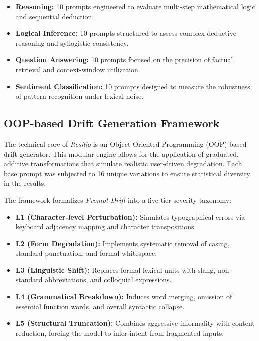 \documentclass[conference]{IEEEtran}
\begin{document}
\begin{itemize}
\item \textbf{Reasoning:} 10 prompts engineered to evaluate multi-step mathematical logic and sequential deduction.
\item \textbf{Logical Inference:} 10 prompts structured to assess complex deductive reasoning and syllogistic consistency.
\item \textbf{Question Answering:} 10 prompts focused on the precision of factual retrieval and context-window utilization.
\item \textbf{Sentiment Classification:} 10 prompts designed to measure the robustness of pattern recognition under lexical noise.
\end{itemize}

\subsection{OOP-based Drift Generation Framework}

The technical core of \textit{Resilio} is an Object-Oriented Programming (OOP) based drift generator. This modular engine allows for the application of graduated, additive transformations that simulate realistic user-driven degradation. Each base prompt was subjected to 16 unique variations to ensure statistical diversity in the results.

The framework formalizes \textit{Prompt Drift} into a five-tier severity taxonomy:

\begin{itemize}
\item \textbf{L1 (Character-level Perturbation):} Simulates typographical errors via keyboard adjacency mapping and character transpositions.
\item \textbf{L2 (Form Degradation):} Implements systematic removal of casing, standard punctuation, and formal whitespace.
\item \textbf{L3 (Linguistic Shift):} Replaces formal lexical units with slang, non-standard abbreviations, and colloquial expressions.
\item \textbf{L4 (Grammatical Breakdown):} Induces word merging, omission of essential function words, and overall syntactic collapse.
\item \textbf{L5 (Structural Truncation):} Combines aggressive informality with content reduction, forcing the model to infer intent from fragmented inputs.
\end{itemize}
\end{document}
